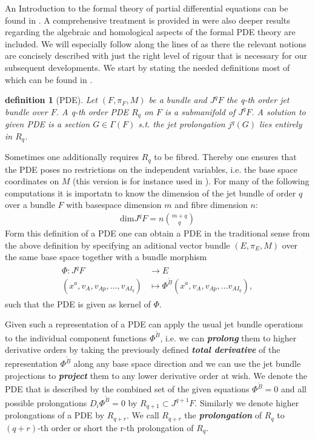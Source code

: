 \documentclass[a4paper,12pt, DIV=14, BCOR=5mm, twoside, headsepline]{scrbook}
\newtheorem{definition}{definition}[section]
\begin{document}
An Introduction to the formal theory of partial differential equations can be found in \cite{saunders_1989}. A comprehensive treatment is provided in \cite{seiler2009involution} were also deeper results regarding the algebraic and homological aspects of the formal PDE theory are included. We will especially follow along the lines of \cite{seiler1994analysis} as there the relevant notions are concisely described with just the right level of rigour that is necessary for our subsequent developments. We start by stating the needed definitions most of which can be found in \cite{seiler1994analysis}.
\begin{definition}[PDE]
Let $(F,\pi_F,M)$ be a bundle and $J^qF$ the q-th order jet bundle over $F$. A q-th order PDE $R_q$ on $F$ is a  submanifold of $J^qF$. A solution to given PDE is a section $G \in \Gamma(F)$ s.t. the jet prolongation $j^q(G)$ lies entirely in $R_q$.  
\end{definition}
Sometimes one additionally requires $R_q$ to be fibred. Thereby one ensures that the PDE poses no restrictions on the independent variables, i.e. the base space coordinates on $M$ (this version is for instance used in \cite{seiler1994analysis}).
For many of the following computations it is importatn to know the dimension of the jet bundle of order $q$ over a bundle $F$ with basespace dimension $m$ and fibre dimension $n$:
\begin{align}
    \mathrm{dim}J^qF = n\binom{m+q}{q}
\end{align}
Form this definition of a PDE one can obtain a PDE in the traditional sense from the above definition by specifying an aditional vector bundle $(E,\pi_E,M)$ over the same base space together with a bundle morphism
\begin{align}
    \begin{aligned}
    \Phi : J^qF &\longrightarrow E\\
    (x^a, v_A, v_{Ap},...,v_{AI_q}) &\longmapsto \Phi^{\tilde{B}}(x^a, v_A, v_{Ap},...v_{AI_q}),
    \end{aligned}
\end{align}
such that the PDE is given as kernel of $\Phi$. 

Given such a representation of a PDE can apply the usual jet bundle operations to the individual component functions $\Phi^{\tilde{B}}$, i.e. we can \textit{\textbf{prolong}} them to higher derivative orders by taking the previously defined \textit{\textbf{total derivative}} of the representation $\Phi^{\tilde{B}}$ along any base space direction and we can use the jet bundle projections to \textit{\textbf{project}} them to any lower derivative order at wish. We denote the PDE that is described by the combined set of the given equations $\Phi^{\tilde{B}}=0$ and all possible prolongations $D_i\Phi^{\tilde{B}}=0$ by $R_{q+1} \subset J^{q+1}F$. Similarly we denote higher prolongations of a PDE by $R_{q+r}$. We call $R_{q+r}$ the \textit{\textbf{prolongation}} of $R_q$ to $(q+r)$-th order or short the r-th prolongation of $R_q$. 
\end{document}
